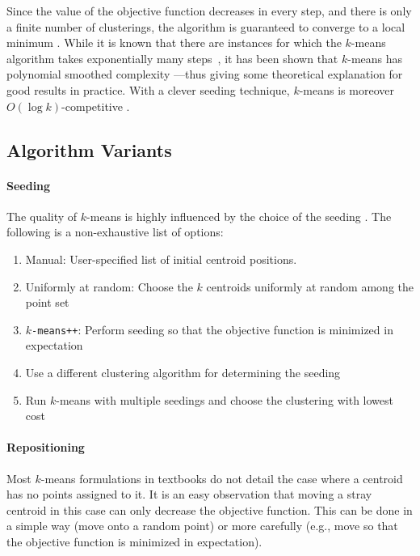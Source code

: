 Since the value of the objective function decreases in every step, and there is only a finite number of clusterings, the algorithm is guaranteed to converge to a local minimum \cite[Section~16.4]{CS08a}. While it is known that there are instances for which the $k$-means algorithm takes exponentially many steps~\cite{V09a}, it has been shown that $k$-means has polynomial smoothed complexity \cite{AMR09a}---thus giving some theoretical explanation for good results in practice. With a clever seeding technique, $k$-means is moreover $O(\log k)$-competitive \cite{AV07a}.


\subsection{Algorithm Variants}

\paragraph{Seeding}

The quality of $k$-means is highly influenced by the choice of the seeding \cite{AV07a}. The following is a non-exhaustive list of options:
\begin{enumerate}
	\item Manual: User-specified list of initial centroid positions.
	\item Uniformly at random: Choose the $k$ centroids uniformly at random among the point set
	\item \texttt{$k$-means++}: Perform seeding so that the objective function is minimized in expectation \cite{AV07a}
	\item Use a different clustering algorithm for determining the seeding \cite{MNU00a}
	\item Run $k$-means with multiple seedings and choose the clustering with lowest cost
\end{enumerate}

\paragraph{Repositioning}

Most $k$-means formulations in textbooks do not detail the case where a centroid has no points assigned to it. It is an easy observation that moving a stray centroid in this case can only decrease the objective function. This can be done in a simple way (move onto a random point) or more carefully (e.g., move so that the objective function is minimized in expectation).

